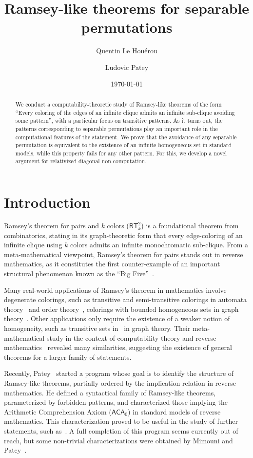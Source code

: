 \documentclass{article}
\title{Ramsey-like theorems for separable permutations}
\author{Quentin Le Houérou \and Ludovic Patey}
\date{\today}
\numberwithin{theorem}{section}
\newcommand{\RT}[0]{\mathsf{RT}}
\def\qt#1{``#1''}%
\def\qt#1{``#1''}%
\begin{document}
\maketitle

\begin{abstract}
We conduct a computability-theoretic study of Ramsey-like theorems of the form \qt{Every coloring of the edges of an infinite clique admits an infinite sub-clique avoiding some pattern}, with a particular focus on transitive patterns. As it turns out, the patterns corresponding to separable permutations play an important role in the computational features of the statement. We prove that the avoidance of any separable permutation is equivalent to the existence of an infinite homogeneous set in standard models, while this property fails for any other pattern. For this, we develop a novel argument for relativized diagonal non-computation.
\end{abstract}

\section{Introduction}

Ramsey's theorem for pairs and $k$ colors ($\RT^2_k$) is a foundational theorem from combinatorics, stating in its graph-theoretic form that every edge-coloring of an infinite clique using $k$ colors admits an infinite monochromatic sub-clique. From a meta-mathematical viewpoint, Ramsey's theorem for pairs stands out in reverse mathematics, as it constitutes the first counter-example of an important structural phenomenon known as the \qt{Big Five}~\cite{simpson2009subsystems,hirschfeldt2015slicing}.

Many real-world applications of Ramsey's theorem in mathematics involve degenerate colorings, such as transitive and semi-transitive colorings in automata theory~\cite{murakami2014ramseyan} and order theory~\cite{hirschfeldt2007combinatorial}, colorings with bounded homogeneous sets in graph theory~\cite{dilworth1950decomposition}. Other applications only require the existence of a weaker notion of homogeneity, such as transitive sets in~\cite{erdhos_representation_1964} in graph theory. Their meta-mathematical study in the context of computability-theory and reverse mathematics~\cite{hirschfeldt2007combinatorial,houerou2025reverse,lerman2013separating} revealed many similarities, suggesting the existence of general theorems for a larger family of statements.

Recently, Patey~\cite{patey2022ramseylike} started a program whose goal is to identify the structure of Ramsey-like theorems, partially ordered by the implication relation in reverse mathematics. He defined a syntactical family of Ramsey-like theorems, parameterized by forbidden patterns, and characterized those implying the Arithmetic Comprehension Axiom ($\mathsf{ACA}_0$) in standard models of reverse mathematics. This characterization proved to be useful in the study of further statements, such as~\cite[Chapter 4]{solda2021calibrating}. A full completion of this program seems currently out of reach, but some non-trivial characterizations were obtained by Mimouni and Patey~\cite{mimouni2025ramseylike}.
\end{document}
